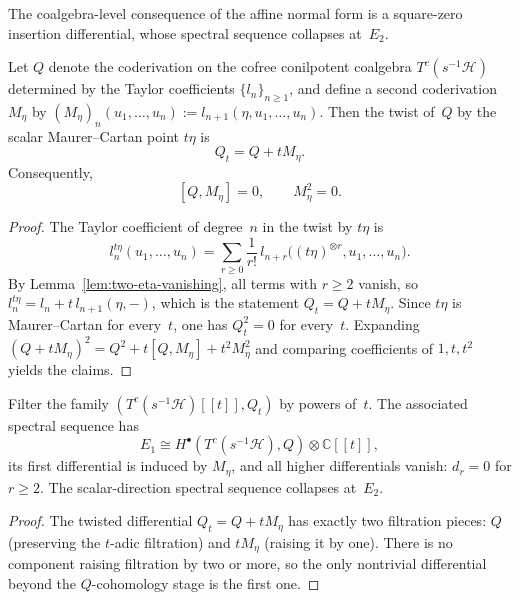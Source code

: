 The coalgebra-level consequence of the affine normal form is a
square-zero insertion differential, whose spectral sequence collapses
at~$E_2$.

\begin{proposition}
\label{prop:square-zero-insertion}
Let $Q$ denote the coderivation on the cofree conilpotent coalgebra
$T^c(s^{-1}\mathcal{H})$ determined by the Taylor coefficients
$\{l_n\}_{n \geq 1}$, and define a second coderivation $M_\eta$
by $(M_\eta)_n(u_1, \ldots, u_n) := l_{n+1}(\eta, u_1, \ldots, u_n)$.
Then the twist of~$Q$ by the scalar Maurer--Cartan point $t\eta$ is
\[
Q_t = Q + t M_\eta.
\]
Consequently,
\[
[Q, M_\eta] = 0,
\qquad
M_\eta^2 = 0.
\]
\end{proposition}

\begin{proof}
The Taylor coefficient of degree~$n$ in the twist by $t\eta$ is
\[
l_n^{t\eta}(u_1, \ldots, u_n)
= \sum_{r \geq 0} \frac{1}{r!}\,
 l_{n+r}\bigl((t\eta)^{\otimes r}, u_1, \ldots, u_n\bigr).
\]
By Lemma~\ref{lem:two-eta-vanishing}, all terms with $r \geq 2$
vanish, so $l_n^{t\eta} = l_n + t\,l_{n+1}(\eta, -)$, which is the
statement $Q_t = Q + tM_\eta$. Since $t\eta$ is Maurer--Cartan for
every~$t$, one has $Q_t^2 = 0$ for every~$t$. Expanding
$(Q + tM_\eta)^2 = Q^2 + t[Q, M_\eta] + t^2 M_\eta^2$ and comparing
coefficients of $1, t, t^2$ yields the claims.
\end{proof}

\begin{corollary}
\label{cor:two-step-scalar-sseq}
Filter the family
$(T^c(s^{-1}\mathcal{H})[[t]], Q_t)$ by powers of~$t$. The
associated spectral sequence has
\[
E_1 \cong H^\bullet(T^c(s^{-1}\mathcal{H}), Q)
 \otimes \mathbb{C}[[t]],
\]
its first differential is induced by $M_\eta$, and all higher
differentials vanish: $d_r = 0$ for $r \geq 2$. The scalar-direction
spectral sequence collapses at~$E_2$.
\end{corollary}

\begin{proof}
The twisted differential $Q_t = Q + tM_\eta$ has exactly two
filtration pieces: $Q$ (preserving the $t$-adic filtration) and
$tM_\eta$ (raising it by one). There is no component raising
filtration by two or more, so the only nontrivial differential
beyond the $Q$-cohomology stage is the first one.
\end{proof}

